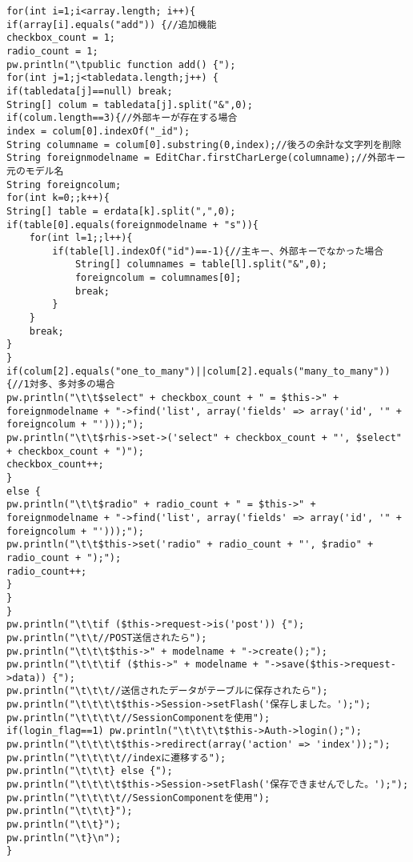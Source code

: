 \documentclass{funthesis}
\begin{document}
\begin{lstlisting}[caption=WriteController .java,label=1]
for(int i=1;i<array.length; i++){
if(array[i].equals("add")) {//追加機能
checkbox_count = 1;
radio_count = 1;
pw.println("\tpublic function add() {");
for(int j=1;j<tabledata.length;j++) {
if(tabledata[j]==null) break;
String[] colum = tabledata[j].split("&",0);
if(colum.length==3){//外部キーが存在する場合
index = colum[0].indexOf("_id");
String columname = colum[0].substring(0,index);//後ろの余計な文字列を削除
String foreignmodelname = EditChar.firstCharLerge(columname);//外部キー元のモデル名
String foreigncolum;
for(int k=0;;k++){
String[] table = erdata[k].split(",",0);
if(table[0].equals(foreignmodelname + "s")){
	for(int l=1;;l++){
		if(table[l].indexOf("id")==-1){//主キー、外部キーでなかった場合
			String[] columnames = table[l].split("&",0);
			foreigncolum = columnames[0];
			break;
		}
	}
	break;
}
}
if(colum[2].equals("one_to_many")||colum[2].equals("many_to_many")){//1対多、多対多の場合
pw.println("\t\t$select" + checkbox_count + " = $this->" + foreignmodelname + "->find('list', array('fields' => array('id', '" + foreigncolum + "')));");
pw.println("\t\t$rhis->set->('select" + checkbox_count + "', $select" + checkbox_count + ")");
checkbox_count++;
}
else {
pw.println("\t\t$radio" + radio_count + " = $this->" + foreignmodelname + "->find('list', array('fields' => array('id', '" + foreigncolum + "')));");
pw.println("\t\t$this->set('radio" + radio_count + "', $radio" + radio_count + ");");			
radio_count++;
}
}
}
pw.println("\t\tif ($this->request->is('post')) {");
pw.println("\t\t//POST送信されたら");
pw.println("\t\t\t$this->" + modelname + "->create();");
pw.println("\t\t\tif ($this->" + modelname + "->save($this->request->data)) {");
pw.println("\t\t\t//送信されたデータがテーブルに保存されたら");
pw.println("\t\t\t\t$this->Session->setFlash('保存しました。');");
pw.println("\t\t\t\t//SessionComponentを使用");
if(login_flag==1) pw.println("\t\t\t\t$this->Auth->login();");
pw.println("\t\t\t\t$this->redirect(array('action' => 'index'));");
pw.println("\t\t\t\t//indexに遷移する");
pw.println("\t\t\t} else {");
pw.println("\t\t\t\t$this->Session->setFlash('保存できませんでした。');");
pw.println("\t\t\t\t//SessionComponentを使用");
pw.println("\t\t\t}");
pw.println("\t\t}");
pw.println("\t}\n");
}


\end{lstlisting}
\end{document}

